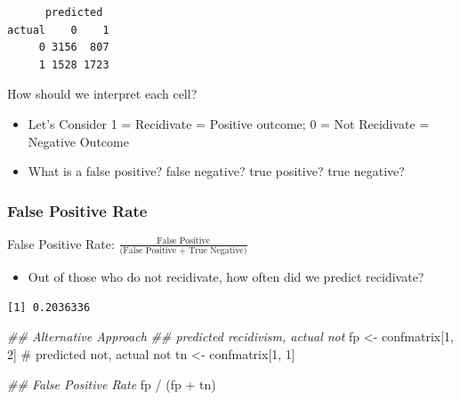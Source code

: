 \documentclass[
  letterpaper,
  DIV=11,
  numbers=noendperiod]{scrreprt}
\newenvironment{Shaded}{\begin{snugshade}}{\end{snugshade}}
\newcommand{\CommentTok}[1]{\textcolor[rgb]{0.37,0.37,0.37}{#1}}
\newcommand{\DecValTok}[1]{\textcolor[rgb]{0.68,0.00,0.00}{#1}}
\newcommand{\DocumentationTok}[1]{\textcolor[rgb]{0.37,0.37,0.37}{\textit{#1}}}
\newcommand{\FunctionTok}[1]{\textcolor[rgb]{0.28,0.35,0.67}{#1}}
\newcommand{\NormalTok}[1]{\textcolor[rgb]{0.00,0.23,0.31}{#1}}
\newcommand{\OtherTok}[1]{\textcolor[rgb]{0.00,0.23,0.31}{#1}}
\newcommand{\SpecialCharTok}[1]{\textcolor[rgb]{0.37,0.37,0.37}{#1}}
\providecommand{\tightlist}{%
  \setlength{\itemsep}{0pt}\setlength{\parskip}{0pt}}\usepackage{longtable,booktabs,array}
\begin{document}
\begin{verbatim}
      predicted
actual    0    1
     0 3156  807
     1 1528 1723
\end{verbatim}

How should we interpret each cell?

\begin{itemize}
\tightlist
\item
  Let's Consider 1 = Recidivate = Positive outcome; 0 = Not Recidivate =
  Negative Outcome
\item
  What is a false positive? false negative? true positive? true
  negative?
\end{itemize}

\hypertarget{false-positive-rate}{%
\subsubsection{False Positive Rate}\label{false-positive-rate}}

False Positive Rate:
\(\frac{\text{False Positive}}{\text{(False Positive + True Negative)}}\)

\begin{itemize}
\tightlist
\item
  Out of those who do not recidivate, how often did we predict
  recidivate?
\end{itemize}

\begin{Shaded}
\end{Shaded}

\begin{verbatim}
[1] 0.2036336
\end{verbatim}

\begin{Shaded}
\begin{Highlighting}[]
\DocumentationTok{\#\# Alternative Approach}
\DocumentationTok{\#\# predicted recidivism, actual not}
\NormalTok{fp }\OtherTok{\textless{}{-}}\NormalTok{ confmatrix[}\DecValTok{1}\NormalTok{, }\DecValTok{2}\NormalTok{]}
\CommentTok{\# predicted not, actual not}
\NormalTok{tn }\OtherTok{\textless{}{-}}\NormalTok{ confmatrix[}\DecValTok{1}\NormalTok{, }\DecValTok{1}\NormalTok{]}

\DocumentationTok{\#\# False Positive Rate}
\NormalTok{fp }\SpecialCharTok{/}\NormalTok{ (fp }\SpecialCharTok{+}\NormalTok{ tn)}
\end{Highlighting}
\end{Shaded}
\end{document}
